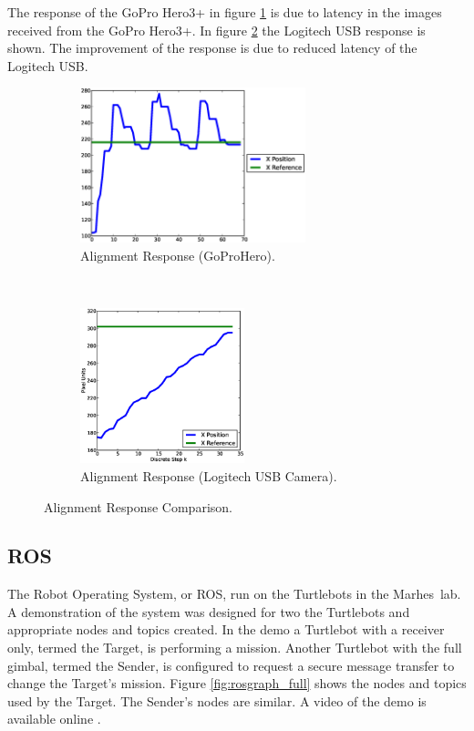 \documentclass[botnum, fleqn]{unmeethesis}
\def \marhes{{\sc Marhes~}}
\begin{document}
The response of the GoPro Hero3+ in figure \ref{fig:goproresp} is due to latency in the images received from the GoPro Hero3+. In figure \ref{fig:logiresp} the Logitech USB response is shown. The improvement of the response is due to reduced latency of the Logitech USB.  
\begin{figure}
  \begin{center}
    \begin{subfigure}{0.49\textwidth}
        \centering 
        \includegraphics[height=45mm]{figures/old_xpos_xref.eps}
        \caption{\label{fig:goproresp}\scriptsize Alignment Response (GoProHero).}
    \end{subfigure}\\
    \begin{subfigure}{0.49\textwidth}
        \centering 
        \includegraphics[height=45mm]{figures/alignmentTest.eps}
        \caption{\scriptsize Alignment Response (Logitech USB Camera).}
    \end{subfigure}
    \caption{\label{fig:logiresp}\small Alignment Response Comparison.}
  \end{center}
\end{figure}

\subsection*{ROS} \label{sec:ros}
The Robot Operating System, or ROS, run on the Turtlebots in the \marhes lab. A demonstration of the system was designed for two the Turtlebots and appropriate nodes and topics created. In the demo a Turtlebot with a receiver only, termed the Target, is performing a mission. Another Turtlebot with the full gimbal, termed the Sender, is configured to request a secure message transfer to change the Target's mission.  Figure \ref{fig:rosgraph_full} shows the nodes and topics used by the Target. The Sender's nodes are similar. A video of the demo is available online \cite{video_demo}.
\end{document}
